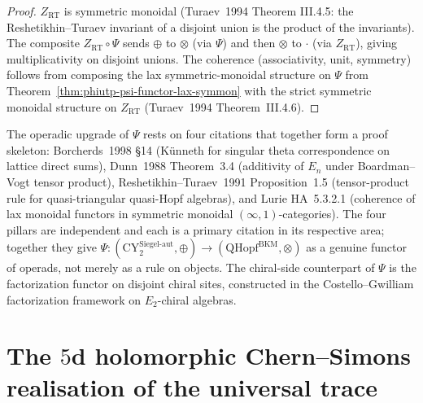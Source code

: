 \begin{proof}
$Z_{\mathrm{RT}}$ is symmetric monoidal
\textup{(}Turaev~1994 Theorem III.4.5: the Reshetikhin--Turaev
invariant of a disjoint union is the product of the invariants\textup{).}
The composite $Z_{\mathrm{RT}} \circ \Psi$ sends
$\oplus$ to $\otimes$ (via $\Psi$) and then $\otimes$ to $\cdot$ (via
$Z_{\mathrm{RT}}$), giving multiplicativity on disjoint unions. The
coherence (associativity, unit, symmetry) follows from composing the
lax symmetric-monoidal structure on $\Psi$ from
Theorem~\ref{thm:phiutp-psi-functor-lax-symmon} with the strict symmetric
monoidal structure on $Z_{\mathrm{RT}}$ \textup{(}Turaev~1994
Theorem~III.4.6\textup{).}
\end{proof}

\begin{remark}
\label{rem:phiutp-four-pillars}
The operadic upgrade of $\Psi$ rests on four citations that together
form a proof skeleton: Borcherds~1998 \S14 (K\"unneth for singular
theta correspondence on lattice direct sums), Dunn~1988 Theorem~3.4
(additivity of $E_n$ under Boardman--Vogt tensor product),
Reshetikhin--Turaev~1991 Proposition~1.5 (tensor-product rule for
quasi-triangular quasi-Hopf algebras), and Lurie HA~5.3.2.1 (coherence
of lax monoidal functors in symmetric monoidal
$(\infty,1)$-categories). The four pillars are independent and each is
a primary citation in its respective area; together they give
$\Psi: (\mathrm{CY}^{\mathrm{Siegel\text{-}aut}}_2, \oplus) \to
(\mathrm{QHopf}^{\mathrm{BKM}}, \otimes)$ as a genuine functor of
operads, not merely as a rule on objects. The chiral-side counterpart
of $\Psi$ is the factorization functor on disjoint chiral sites,
constructed in the Costello--Gwilliam factorization framework on
$E_2$-chiral algebras.
\end{remark}

\section{The \texorpdfstring{$5$}{5}d holomorphic Chern--Simons realisation of the universal trace}
\label{sec:phiutp-5d-hcs-cfg-realisation}

